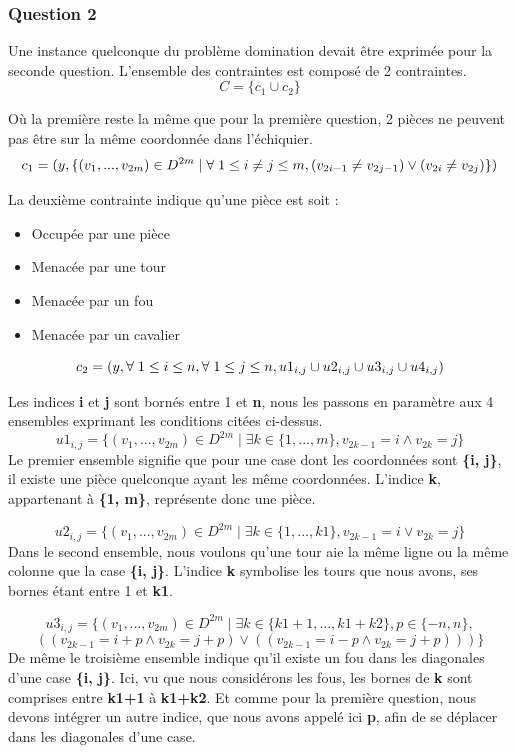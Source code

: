 \documentclass{article}
\begin{document}
\subsubsection{Question 2}
Une instance quelconque du problème domination devait être exprimée pour la seconde question. L'ensemble des contraintes est composé de 2 contraintes.
$$C = \{c_{1} \cup c_{2}\} $$

Où la première reste la même que pour la première question, 2 pièces ne peuvent pas être sur la même coordonnée dans l'échiquier.\\
$$c_{1} = ( y, \{ (v_{1}, ..., v_{2m}) \in  D^{2m} \mid \forall \hspace{0.1cm} 1\leq i \neq j \leq m, (v_{2i-1} \neq v_{2j-1}) \vee  (v_{2i} \neq v_{2j}) \} )$$ 

La deuxième contrainte indique qu'une pièce est soit :
\begin{itemize}
\item Occupée par une pièce
\item Menacée par une tour
\item Menacée par un fou
\item Menacée par un cavalier
\end{itemize}

$$c_{2} = (y, \forall \hspace{0.1cm} 1 \leq i \leq n, \forall \hspace{0.1cm} 1 \leq j \leq n,  u1_{i,j} \cup u2_{i,j} \cup u3_{i,j} \cup u4_{i,j})$$
    
Les indices \textbf{i} et \textbf{j} sont bornés entre 1 et \textbf{n}, nous les passons en paramètre aux 4 ensembles exprimant les conditions citées ci-dessus. 
\newpage
$$u1_{i,j} = \{(v_{1}, ..., v_{2m}) \in  D^{2m} \mid \exists k \in \{1, ..., m\}, v_{2k-1} = i \wedge v_{2k} = j\}$$
Le premier ensemble signifie que pour une case dont les coordonnées sont \textbf{\{i, j\}}, il existe une pièce quelconque ayant les même coordonnées.
L'indice \textbf{k}, appartenant à \textbf{\{1, m\}}, représente donc une pièce.

$$u2_{i,j} = \{(v_{1}, ..., v_{2m}) \in  D^{2m} \mid \exists k \in \{1, ..., k1\}, v_{2k-1} = i \vee v_{2k} = j\}$$
Dans le second ensemble, nous voulons qu'une tour aie la même ligne ou la même colonne que la case \textbf{\{i, j\}}. L'indice \textbf{k} symbolise les tours que nous avons, ses bornes étant entre 1 et \textbf{k1}.

$$u3_{i,j} = \{(v_{1}, ..., v_{2m}) \in  D^{2m} \mid \exists k \in \{k1+1, ..., k1+k2\}, p \in\{-n, n \},$$
$$ ((v_{2k-1} = i+p \wedge v_{2k} = j+p) \vee ((v_{2k-1} = i-p \wedge v_{2k} = j+p))) \}$$
De même le troisième ensemble indique qu'il existe un fou dans les diagonales d'une case \textbf{\{i, j\}}. Ici, vu que nous considérons les fous, les bornes de \textbf{k} sont comprises entre \textbf{k1+1} à \textbf{k1+k2}. Et comme pour la première question, nous devons intégrer un autre indice, que nous avons appelé ici \textbf{p}, afin de se déplacer dans les diagonales d'une case. 
\end{document}
